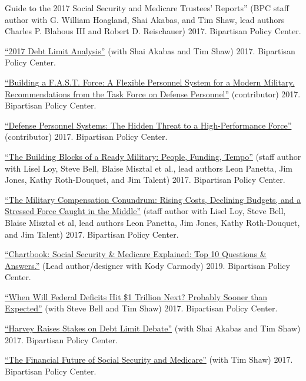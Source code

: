 \documentclass[
  11pt,
]
{article}
\renewenvironment{itemize}{
  \begin{list}{}{
    \setlength{\leftmargin}{1.5em}
  }
}{
  \end{list}
}
\begin{document}
\begin{itemize}
{  Guide to the 2017 Social Security and Medicare Trustees' Reports''}
  (BPC staff author with G. William Hoagland, Shai Akabas, and Tim Shaw,
  lead authors Charles P. Blahous III and Robert D. Reischauer) 2017.
  Bipartisan Policy Center.
\item
  \href{https://bipartisanpolicy.org/download/?file=/wp-content/uploads/2021/07/Debt-Limit-Daily-Presenation-8.23.17.pdf}{``2017
  Debt Limit Analysis''} (with Shai Akabas and Tim Shaw) 2017.
  Bipartisan Policy Center.
\item
  \href{https://bipartisanpolicy.org/download/?file=/wp-content/uploads/2019/03/BPC-Defense-Building-A-FAST-Force.pdf}{``Building
  a F.A.S.T. Force: A Flexible Personnel System for a Modern Military.
  Recommendations from the Task Force on Defense Personnel''}
  (contributor) 2017. Bipartisan Policy Center.
\item
  \href{https://bipartisanpolicy.org/download/?file=/wp-content/uploads/2019/03/BPC-Defense-Personnel-Systems.pdf}{``Defense
  Personnel Systems: The Hidden Threat to a High-Performance Force''}
  (contributor) 2017. Bipartisan Policy Center.
\item
  \href{https://bipartisanpolicy.org/download/?file=/wp-content/uploads/2019/03/BPC-Defense-Military-Readiness.pdf}{``The
  Building Blocks of a Ready Military: People, Funding, Tempo''} (staff
  author with Lisel Loy, Steve Bell, Blaise Misztal et al., lead authors
  Leon Panetta, Jim Jones, Kathy Roth-Douquet, and Jim Talent) 2017.
  Bipartisan Policy Center.
\item
  \href{https://bipartisanpolicy.org/download/?file=/wp-content/uploads/2019/03/BPC-Defense-Personnel-Compensation.pdf}{``The
  Military Compensation Conundrum: Rising Costs, Declining Budgets, and
  a Stressed Force Caught in the Middle''} (staff author with Lisel Loy,
  Steve Bell, Blaise Misztal et al, lead authors Leon Panetta, Jim
  Jones, Kathy Roth-Douquet, and Jim Talent) 2017. Bipartisan Policy
  Center.
\item
  \href{https://bipartisanpolicy.org/download/?file=/wp-content/uploads/2019/03/Social-Security-and-Medicare-Explained-2019.pdf}{``Chartbook:
  Social Security \& Medicare Explained: Top 10 Questions \& Answers.''}
  (Lead author/designer with Kody Carmody) 2019. Bipartisan Policy
  Center.
\item
  \href{https://bipartisanpolicy.org/blog/when-will-federal-deficits-hit-1-trillion-next/}{``When
  Will Federal Deficits Hit \$1 Trillion Next? Probably Sooner than
  Expected''} (with Steve Bell and Tim Shaw) 2017. Bipartisan Policy
  Center.
\item
  \href{https://bipartisanpolicy.org/blog/harvey-raises-stakes-on-debt-limit-debate/}{``Harvey
  Raises Stakes on Debt Limit Debate''} (with Shai Akabas and Tim Shaw)
  2017. Bipartisan Policy Center.
\item
  \href{https://bipartisanpolicy.org/blog/the-financial-future-of-social-security-and-medicare/}{``The
  Financial Future of Social Security and Medicare''} (with Tim Shaw)
  2017. Bipartisan Policy Center.
\end{itemize}
\end{document}
